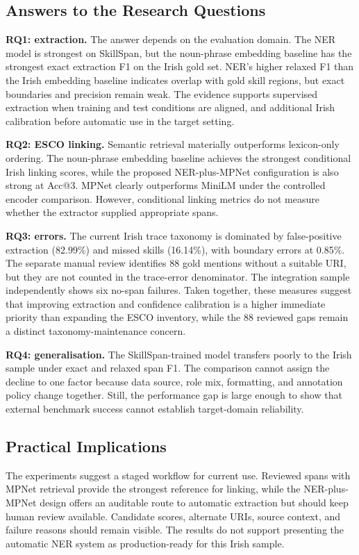 \documentclass[conference]{IEEEtran}
\begin{document}
\subsection{Answers to the Research Questions}
\textbf{RQ1: extraction.} The answer depends on the evaluation domain. The NER model is strongest on SkillSpan, but the noun-phrase embedding baseline has the strongest exact extraction F1 on the Irish gold set. NER's higher relaxed F1 than the Irish embedding baseline indicates overlap with gold skill regions, but exact boundaries and precision remain weak. The evidence supports supervised extraction when training and test conditions are aligned, and additional Irish calibration before automatic use in the target setting.

\textbf{RQ2: ESCO linking.} Semantic retrieval materially outperforms lexicon-only ordering. The noun-phrase embedding baseline achieves the strongest conditional Irish linking scores, while the proposed NER-plus-MPNet configuration is also strong at Acc@3. MPNet clearly outperforms MiniLM under the controlled encoder comparison. However, conditional linking metrics do not measure whether the extractor supplied appropriate spans.

\textbf{RQ3: errors.} The current Irish trace taxonomy is dominated by false-positive extraction (82.99\%) and missed skills (16.14\%), with boundary errors at 0.85\%. The separate manual review identifies 88 gold mentions without a suitable URI, but they are not counted in the trace-error denominator. The integration sample independently shows six no-span failures. Taken together, these measures suggest that improving extraction and confidence calibration is a higher immediate priority than expanding the ESCO inventory, while the 88 reviewed gaps remain a distinct taxonomy-maintenance concern.

\textbf{RQ4: generalisation.} The SkillSpan-trained model transfers poorly to the Irish sample under exact and relaxed span F1. The comparison cannot assign the decline to one factor because data source, role mix, formatting, and annotation policy change together. Still, the performance gap is large enough to show that external benchmark success cannot establish target-domain reliability.

\subsection{Practical Implications}
The experiments suggest a staged workflow for current use. Reviewed spans with MPNet retrieval provide the strongest reference for linking, while the NER-plus-MPNet design offers an auditable route to automatic extraction but should keep human review available. Candidate scores, alternate URIs, source context, and failure reasons should remain visible. The results do not support presenting the automatic NER system as production-ready for this Irish sample.
\end{document}
